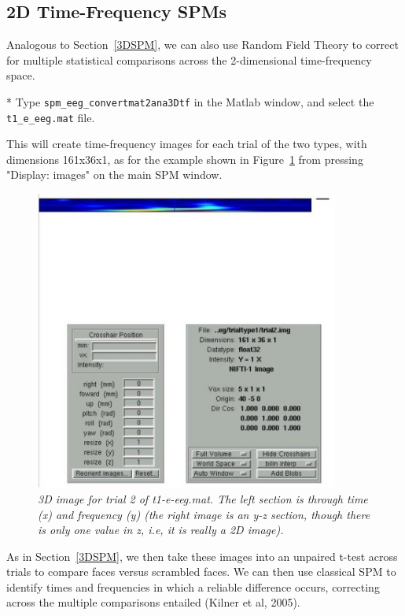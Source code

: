 \subsection{2D Time-Frequency SPMs}

Analogous to Section~\ref{3DSPM}, we can also use Random Field Theory to correct for multiple statistical comparisons across the 2-dimensional time-frequency space.

* Type \verb!spm_eeg_convertmat2ana3Dtf! in the Matlab window, and select the \verb!t1_e_eeg.mat! file.

This will create time-frequency images for each trial of the two types, with dimensions 161x36x1, as for the example shown in Figure~\ref{fig_32_15} from pressing "Display: images" on the main SPM window.

\begin{figure}
\begin{center}
\includegraphics[width=100mm]{multimodal/figures/figure_32_15}
\caption{\em  3D image for trial 2 of t1-e-eeg.mat. The left section is through time (x) and frequency (y) (the right image is an y-z section, though there is only one value in z, i.e, it is really a 2D image).\label{fig_32_15}}
\end{center}
\end{figure}

As in Section~\ref{3DSPM}, we then take these images into an unpaired t-test across trials to compare faces versus scrambled faces. We can then use classical SPM to identify times and frequencies in which a reliable difference occurs, correcting across the multiple comparisons entailed (Kilner et al, 2005).

